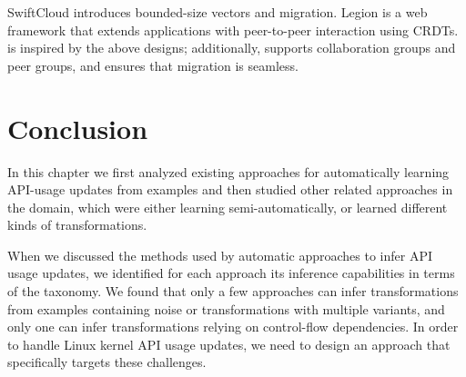 SwiftCloud \cite{rep:pan:sh177} introduces bounded-size
vectors and migration.
Legion \cite{app:rep:syn:1775} is a web framework that extends applications
with peer-to-peer interaction using CRDTs.
\system{} is inspired by the above designs; additionally, \system{}
supports collaboration groups and peer groups, and ensures that
migration is seamless.

\section{Conclusion}
In this chapter we first analyzed existing approaches for automatically learning
API-usage updates from examples and then studied other related approaches in the domain,
which were either learning semi-automatically, or learned different kinds of transformations.

When we discussed the methods used by automatic approaches to infer
API usage updates, we identified for each approach its inference
capabilities in terms of the taxonomy.
We found that only a few approaches can infer transformations from
examples containing noise or transformations with multiple variants,
and only one can infer transformations relying on control-flow dependencies.
In order to handle Linux kernel API usage updates, we need to design an approach
that specifically targets these challenges.
